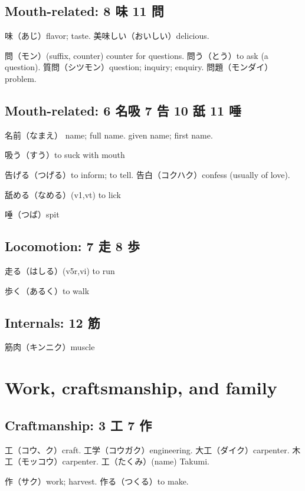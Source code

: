 \subsection{Mouth-related: 8 味 11 問}

味（あじ）flavor; taste.
美味しい（おいしい）delicious.

問（モン）(suffix, counter) counter for questions.
問う（とう）to ask (a question).
質問（シツモン）question; inquiry; enquiry.
問題（モンダイ）problem.

\subsection{Mouth-related: 6 名吸 7 告 10 舐 11 唾}

名前（なまえ）
name; full name.
given name; first name.

吸う（すう）to suck with mouth

告げる（つげる）to inform; to tell.
告白（コクハク）confess (usually of love).

舐める（なめる）(v1,vt) to lick

唾（つば）spit

\subsection{Locomotion: 7 走 8 歩}

走る（はしる）(v5r,vi) to run

歩く（あるく）to walk

\subsection{Internals: 12 筋}

筋肉（キンニク）muscle

\section{Work, craftsmanship, and family}

\subsection{Craftmanship: 3 工 7 作}

工（コウ、ク）craft.
工学（コウガク）engineering.
大工（ダイク）carpenter.
木工（モッコウ）carpenter.
工（たくみ）(name) Takumi.

作（サク）work; harvest.
作る（つくる）to make.

